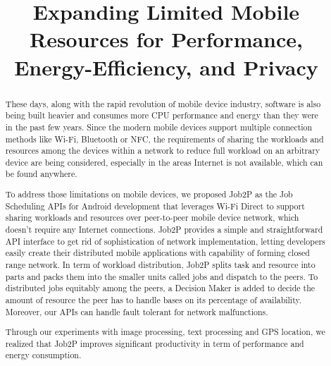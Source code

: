 \documentclass[conference]{IEEEtran}
\begin{document}
%
\title{Expanding Limited Mobile Resources for Performance, Energy-Efficiency, and Privacy}


\author{
\and
{}
}


\maketitle

\begin{abstract}
These days, along with the rapid revolution of mobile device industry, software is also being built heavier and consumes more CPU performance and energy than they were in the past few years. Since the modern mobile devices support multiple connection methods like Wi-Fi, Bluetooth or NFC, the requirements of sharing the workloads and resources among the devices within a network to reduce full workload on an arbitrary device are being considered, especially in the areas Internet is not available, which can be found anywhere.

To address those limitations on mobile devices, we proposed Job2P as the Job Scheduling APIs for Android development that leverages Wi-Fi Direct to support sharing workloads and resources over peer-to-peer mobile device network, which doesn't require any Internet connections. Job2P provides a simple and straightforward API interface to get rid of sophistication of network implementation, letting developers easily create their distributed mobile applications with capability of forming closed range network. In term of workload distribution, Job2P splits task and resource into parts and packs them into the smaller units called jobs and dispatch to the peers. To distributed jobs equitably among the peers, a Decision Maker is added to decide the amount of resource the peer has to handle bases on its percentage of availability. Moreover, our APIs can handle fault tolerant for network malfunctions. 

Through our experiments with image processing, text processing and GPS location, we realized that Job2P improves significant productivity in term of performance and energy consumption. 
\end{abstract}
\end{document}
